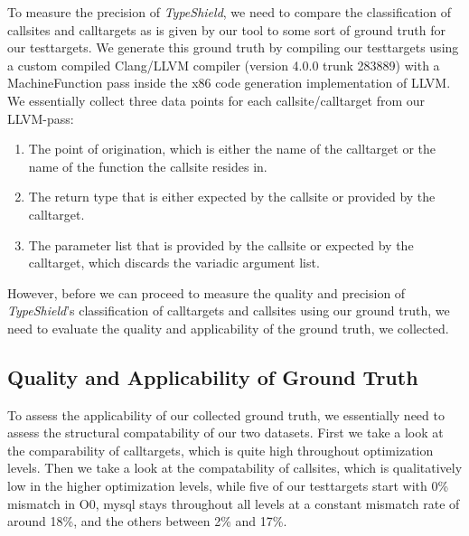 To measure the precision of \textit{TypeShield}, we need to compare the classification of callsites and calltargets as is given by our tool to some sort of ground truth for our testtargets. We generate this ground truth by compiling our testtargets using a custom compiled Clang/LLVM compiler (version 4.0.0 trunk 283889) with a MachineFunction pass inside the x86 code generation implementation of LLVM. We essentially collect three data points for each callsite/calltarget from our LLVM-pass:
\begin{enumerate}
\item The point of origination, which is either the name of the calltarget or the name of the function the callsite resides in.
\item The return type that is either expected by the callsite or provided by the calltarget.
\item The parameter list that is provided by the callsite or expected by the calltarget, which discards the variadic argument list.
\end{enumerate}
However, before we can proceed to measure the quality and precision of \textit{TypeShield}'s classification of calltargets and callsites using our ground truth, we need to evaluate the quality and applicability of the ground truth, we collected.

\subsection{Quality and Applicability of Ground Truth}
\label{subsection:typeshieldprecision}
To assess the applicability of our collected ground truth, we essentially need to assess the structural compatability of our two datasets. First we take a look at the comparability of calltargets, which is quite high throughout optimization levels. Then we take a look at the compatability of callsites, which is qualitatively low in the higher optimization levels, while five of our testtargets start with 0\% mismatch in O0, mysql stays throughout all levels at a constant mismatch rate of around 18\%, and the others between 2\% and 17\%.

